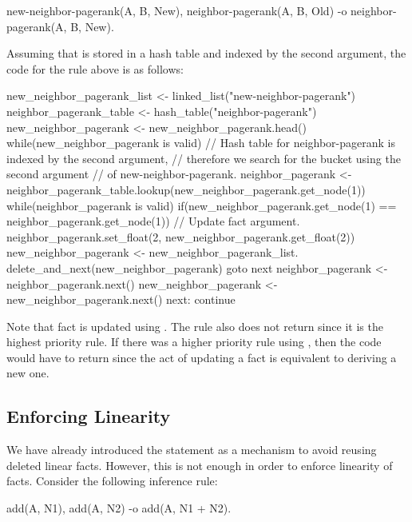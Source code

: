 \begin{Code}
new-neighbor-pagerank(A, B, New),
neighbor-pagerank(A, B, Old)
   -o neighbor-pagerank(A, B, New).
\end{Code}

Assuming that  is stored in a hash table and indexed by
the second argument, the code for the rule above is as follows:

\begin{LineCode}
new_neighbor_pagerank_list <- linked_list("new-neighbor-pagerank")
neighbor_pagerank_table <- hash_table("neighbor-pagerank")
new_neighbor_pagerank <- new_neighbor_pagerank.head()
while(new_neighbor_pagerank is valid)
{
   // Hash table for neighbor-pagerank is indexed by the second argument,
   // therefore we search for the bucket using the second argument
   // of new-neighbor-pagerank.
   neighbor_pagerank <- neighbor_pagerank_table.lookup(new_neighbor_pagerank.get_node(1))
   while(neighbor_pagerank is valid)
   {
      if(new_neighbor_pagerank.get_node(1) == neighbor_pagerank.get_node(1))
      {
         // Update fact argument.
         neighbor_pagerank.set_float(2, new_neighbor_pagerank.get_float(2))
         new_neighbor_pagerank <- new_neighbor_pagerank_list.
                  delete_and_next(new_neighbor_pagerank)
         goto next
      }
      neighbor_pagerank <- neighbor_pagerank.next()
   }
   new_neighbor_pagerank <- new_neighbor_pagerank.next()
next:
   continue
}
\end{LineCode}

Note that  fact is updated using . The
rule also does not return since it is the highest priority rule. If there was a
higher priority rule using , then the code would have to
return since the act of updating a fact is equivalent to deriving a new one.

\subsection{Enforcing Linearity}

We have already introduced the  statement as a mechanism to avoid
reusing deleted linear facts. However, this is not enough in order to enforce
linearity of facts. Consider the following inference rule:

\begin{Code}
add(A, N1),
add(A, N2)
   -o add(A, N1 + N2).
\end{Code}

